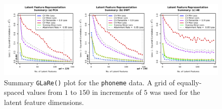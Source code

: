 \begin{figure}
    \centering
    \includegraphics[width=1\linewidth]{figures/phoneme-results.pdf}
    \caption{Summary \texttt{GLaRe()} plot for the \texttt{phoneme} data. A grid of equally-spaced values from $1$ to $150$ in increments of $5$ was used for the latent feature dimensions.}
    \label{fig:phoneme-results}
\end{figure}